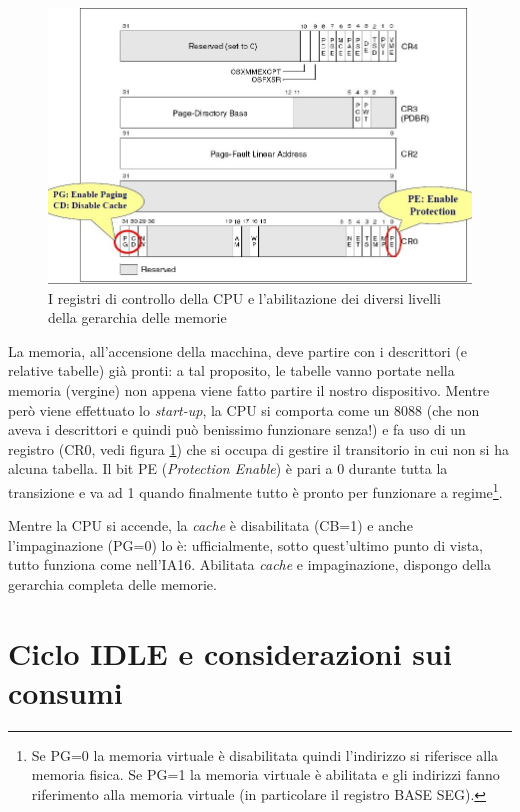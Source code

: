 \begin{figure}[!h]
\centering
\includegraphics[width=0.9\columnwidth]{img/PGeRegistri}
\caption{I registri di controllo della CPU e l'abilitazione dei diversi livelli della gerarchia delle memorie}
\label{fig:PGeRegistri}
\end{figure}

La memoria, all'accensione della macchina, deve partire con i descrittori (e relative tabelle) già pronti: a tal proposito, le tabelle vanno portate nella memoria (vergine) non appena viene fatto partire il nostro dispositivo. Mentre però viene effettuato lo \textit{start-up}, la CPU si comporta come un 8088 (che non aveva i descrittori e quindi può benissimo funzionare senza!) e fa uso di un registro (CR0, vedi figura \ref{fig:PGeRegistri}) che si occupa di gestire il transitorio in cui non si ha alcuna tabella. Il bit PE (\textit{Protection Enable}) è pari a 0 durante tutta la transizione e va ad 1 quando finalmente tutto è pronto per funzionare a regime\footnote{Se PG=0 la memoria virtuale è disabilitata quindi l'indirizzo si riferisce alla memoria fisica. Se PG=1 la memoria virtuale è abilitata e gli indirizzi fanno riferimento alla memoria virtuale (in particolare il registro BASE SEG).}.

Mentre la CPU si accende, la \textit{cache} è disabilitata (CB=1) e anche l'impaginazione (PG=0) lo è: ufficialmente, sotto quest'ultimo punto di vista, tutto funziona come nell'IA16.
Abilitata \textit{cache} e impaginazione, dispongo della gerarchia completa delle memorie.

\section{Ciclo IDLE e considerazioni sui consumi}
\label{sec:idleConsumi}

